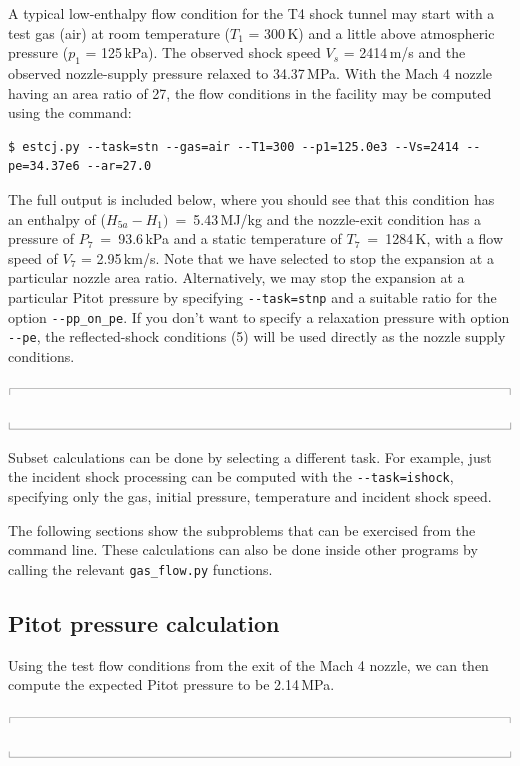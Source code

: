 \documentclass[10pt,a4paper]{article}
\newcommand{\topbar}{\ensuremath{
    \rule{0.1mm}{2.0mm} \rule[2.0mm]{159.5mm}{0.1mm} \rule{0.1mm}{2.0mm}
}}
\newcommand{\bottombar}{\ensuremath{
    \rule{0.1mm}{2.0mm} \rule{159.5mm}{0.1mm} \rule{0.1mm}{2.0mm}
}}
\begin{document}
\medskip
A typical low-enthalpy flow condition for the T4 shock tunnel may start with
a test gas (air) at room temperature ($T_1$ = 300\,K) 
and a little above atmospheric pressure ($p_1$ = 125\,kPa).
The observed shock speed $V_s$ = 2414\,m/s and the observed nozzle-supply pressure
relaxed to 34.37\,MPa.
With the Mach 4 nozzle having an area ratio of 27, the flow conditions in the facility
may be computed using the command:
\begin{verbatim}
$ estcj.py --task=stn --gas=air --T1=300 --p1=125.0e3 --Vs=2414 --pe=34.37e6 --ar=27.0
\end{verbatim}
The full output is included below, where you should see that
this condition has an enthalpy of ($H_{5a} - H_1)$~=~5.43\,MJ/kg and the nozzle-exit condition
has a pressure of $P_7$~=~93.6\,kPa and a static temperature of $T_7$~=~1284\,K,
with a flow speed of $V_7$ = 2.95\,km/s.
Note that we have selected to stop the expansion at a particular nozzle area ratio.
Alternatively, we may stop the expansion at a particular Pitot pressure by specifying
\verb?--task=stnp? and a suitable ratio for the option \verb?--pp_on_pe?.
If you don't want to specify a relaxation pressure with option \verb?--pe?,
the reflected-shock conditions (5) will be used directly as the nozzle supply conditions.

\medskip
\noindent\topbar

\bottombar

\medskip
Subset calculations can be done by selecting a different task.
For example, just the incident shock processing can be computed with the \verb?--task=ishock?,
specifying only the gas, initial pressure, temperature and incident shock speed.

\medskip
The following sections show the subproblems that can be exercised from the command line.
These calculations can also be done inside other programs by calling 
the relevant \verb?gas_flow.py? functions.

\bigskip
\subsection{Pitot pressure calculation}
%
Using the test flow conditions from the exit of the Mach 4 nozzle, we can then
compute the expected Pitot pressure to be 2.14\,MPa.

\medskip
\noindent\topbar

\bottombar

\bigskip
\end{document}
